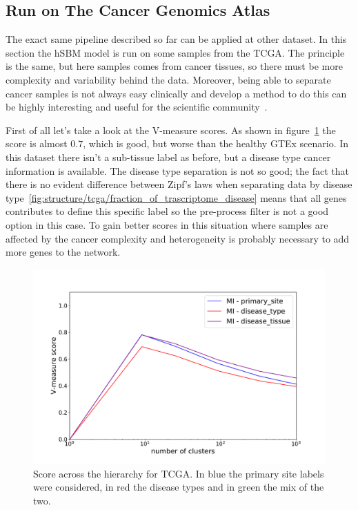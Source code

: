 \subsection{Run on The Cancer Genomics Atlas}
The exact same pipeline described so far can be applied at other dataset. In this section the hSBM model is run on some samples from the TCGA. The principle is the same, but here samples comes from cancer tissues, so there must be more complexity and variability behind the data. Moreover, being able to separate cancer samples is not always easy clinically and develop a method to do this can be highly interesting and useful for the scientific community~\cite{Farver2018}. 

First of all let's take a look at the V-measure scores. As shown in figure~\ref{fig:topic/tcga/metric} the score is almost $0.7$, which is good, but worse than the healthy GTEx scenario. In this dataset there isn't a sub-tissue label as before, but a disease type cancer information is available. The disease type separation is not so good; the fact that there is no evident difference between Zipf's laws when separating data by disease type~\ref{fig:structure/tcga/fraction_of_trascriptome_disease} means that all genes contributes to define this specific label so the pre-process filter is not a good option in this case. To gain better scores in this situation where samples are affected by the cancer complexity and heterogeneity is probably necessary to add more genes to the network.
\begin{figure}[htb!]
    \centering
    \includegraphics[width=0.8\linewidth]{pictures/topic/tcga/metric.pdf}
    \caption{Score across the hierarchy for TCGA. In blue the primary site labels were considered, in red the disease types and in green the mix of the two.}
    \label{fig:topic/tcga/metric}
\end{figure}

